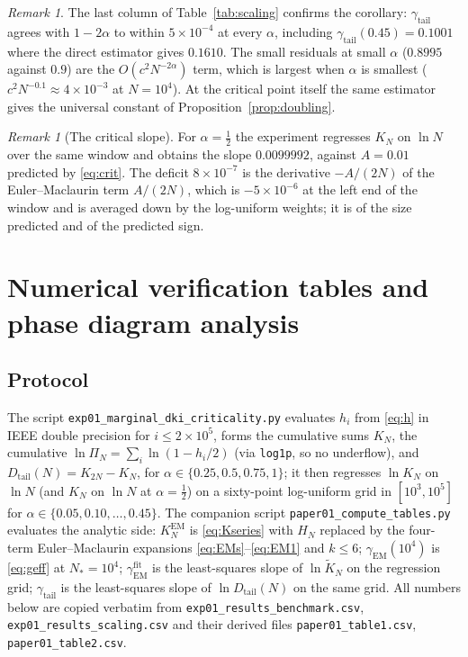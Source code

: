 \documentclass[11pt,reqno]{amsart}
\theoremstyle{plain}
\theoremstyle{definition}
\theoremstyle{remark}
\newtheorem{remark}[theorem]{Remark}
\numberwithin{equation}{section}
\newcommand{\Dtail}{D_{\mathrm{tail}}}
\newcommand{\gEM}{\gamma_{\mathrm{EM}}}
\newcommand{\gtail}{\gamma_{\mathrm{tail}}}
\begin{document}
\begin{remark}
The last column of Table~\ref{tab:scaling} confirms the corollary: $\gtail$ agrees with $1-2\alpha$ to within $5\times10^{-4}$ at every $\alpha$, including $\gtail(0.45)=0.1001$ where the direct estimator gives $0.1610$. The small residuals at small $\alpha$ ($0.8995$ against $0.9$) are the $O(c^2N^{-2\alpha})$ term, which is largest when $\alpha$ is smallest ($c^2N^{-0.1}\approx4\times10^{-3}$ at $N=10^4$). At the critical point itself the same estimator gives the universal constant of Proposition~\ref{prop:doubling}.
\end{remark}

\begin{remark}[The critical slope]
For $\alpha=\frac12$ the experiment regresses $K_N$ on $\ln N$ over the same window and obtains the slope $0.0099992$, against $A=0.01$ predicted by \eqref{eq:crit}. The deficit $8\times10^{-7}$ is the derivative $-A/(2N)$ of the Euler--Maclaurin term $A/(2N)$, which is $-5\times10^{-6}$ at the left end of the window and is averaged down by the log-uniform weights; it is of the size predicted and of the predicted sign.
\end{remark}

\section{Numerical verification tables and phase diagram analysis}
\label{sec:numerics}

\subsection*{Protocol}
\begin{sloppypar}
The script \texttt{exp01\_marginal\_dki\_criticality.py} evaluates $h_i$ from \eqref{eq:h} in IEEE double precision for $i\le2\times10^5$, forms the cumulative sums $K_N$, the cumulative $\ln\Pi_N=\sum_i\ln(1-h_i/2)$ (via \texttt{log1p}, so no underflow), and $\Dtail(N)=K_{2N}-K_N$, for $\alpha\in\{0.25,0.5,0.75,1\}$; it then regresses $\ln K_N$ on $\ln N$ (and $K_N$ on $\ln N$ at $\alpha=\frac12$) on a sixty-point log-uniform grid in $[10^3,10^5]$ for $\alpha\in\{0.05,0.10,\dots,0.45\}$. The companion script \texttt{paper01\_compute\_tables.py} evaluates the analytic side: $K_N^{\mathrm{EM}}$ is \eqref{eq:Kseries} with $H_N$ replaced by the four-term Euler--Maclaurin expansions \eqref{eq:EMs}--\eqref{eq:EM1} and $k\le6$; $\gEM(10^4)$ is \eqref{eq:geff} at $N_*=10^4$; $\gEM^{\mathrm{fit}}$ is the least-squares slope of $\ln\widetilde K_N$ on the regression grid; $\gtail$ is the least-squares slope of $\ln\Dtail(N)$ on the same grid. All numbers below are copied verbatim from \texttt{exp01\_results\_benchmark.csv}, \texttt{exp01\_results\_scaling.csv} and their derived files \texttt{paper01\_table1.csv}, \texttt{paper01\_table2.csv}.
\end{sloppypar}
\end{document}
